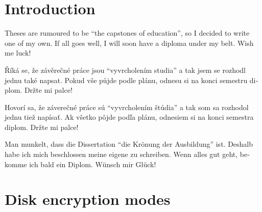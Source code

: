 \documentclass[
  digital,     %
  oneside,     %
  nosansbold,  %
  nocolorbold, %
  lof,         %
  lot,         %
]{fithesis4}
\begin{document}
\chapter*{Introduction}

Theses are rumoured to be \enquote{the capstones of education}, so
I decided to write one of my own. If all goes well, I will soon
have a diploma under my belt. Wish me luck!

\begin{otherlanguage}{czech}
Říká se, že závěrečné práce jsou \enquote{vyvrcholením studia}
a tak jsem se rozhodl jednu také napsat. Pokud vše půjde podle
plánu, odnesu si na konci semestru diplom. Držte mi palce!
\end{otherlanguage}

\begin{otherlanguage}{slovak}
Hovorí sa, že záverečné práce sú \enquote{vyvrcholením štúdia}
a tak som sa rozhodol jednu tiež napísať. Ak všetko pôjde podľa
plánu, odnesiem si na konci semestra diplom. Držte mi palce!
\end{otherlanguage}

\begin{otherlanguage}{german}
Man munkelt, dass die Dissertation \enquote{die Krönung der
Ausbildung} ist. Deshalb habe ich mich beschlossen meine eigene
zu schreiben. Wenn alles gut geht, bekomme ich bald ein Diplom.
Wünsch mir Glück!
\end{otherlanguage}

\chapter{Disk encryption modes}
\label{chap:diskEncModes}
\end{document}
